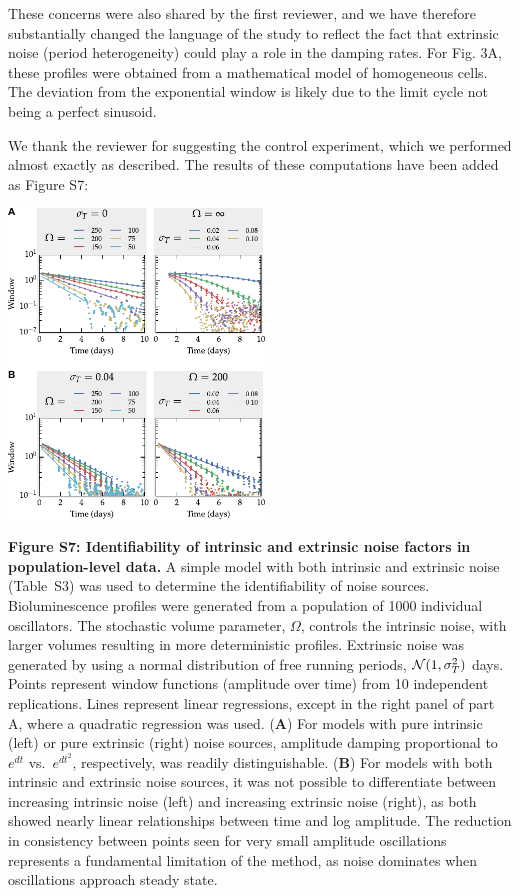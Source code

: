 \documentclass[11pt, letterpaper]{article}
\newenvironment{manuscript}[1]{\begin{center}\begin{tcolorbox}[colback=green!5!white,colframe=green!75!black,width=\textwidth,title={#1},breakable,fonttitle=\bfseries]}{\end{tcolorbox}\end{center}}
\begin{document}
These concerns were also shared by the first reviewer, and we have therefore substantially changed the language of the study to reflect the fact that extrinsic noise (period heterogeneity) could play a role in the damping rates.
For Fig. 3A, these profiles were obtained from a mathematical model of homogeneous cells.
The deviation from the exponential window is likely due to the limit cycle not being a perfect sinusoid.

We thank the reviewer for suggesting the control experiment, which we performed almost exactly as described. The results of these computations have been added as Figure S7:

\begin{manuscript}{Page 22}
  \begin{center}
  \includegraphics[width=0.51\textwidth]{figures/pdfs/FigS7.pdf}
  \end{center}
  {\bfseries Figure S7: Identifiability of intrinsic and extrinsic noise factors in population-level data.} A simple model with both intrinsic and extrinsic noise (Table~S3) was used to determine the identifiability of noise sources. Bioluminescence profiles were generated from a population of 1000 individual oscillators. The stochastic volume parameter, $\Omega$, controls the intrinsic noise, with larger volumes resulting in more deterministic profiles. Extrinsic noise was generated by using a normal distribution of free running periods, ${\cal N}(1, \sigma^2_T)$ days. Points represent window functions (amplitude over time) from 10 independent replications. Lines represent linear regressions, except in the right panel of part A, where a quadratic regression was used.
  ({\bfseries A}) For models with pure intrinsic (left) or pure extrinsic (right) noise sources, amplitude damping proportional to $e^{dt}$ vs.\ $e^{dt^2}$, respectively, was readily distinguishable. 
  ({\bfseries B}) For models with both intrinsic and extrinsic noise sources, it was not possible to differentiate between increasing intrinsic noise (left) and increasing extrinsic noise (right), as both showed nearly linear relationships between time and log amplitude.
  The reduction in consistency between points seen for very small amplitude oscillations represents a fundamental limitation of the method, as noise dominates when oscillations approach steady state.
  
\end{manuscript}
\end{document}
